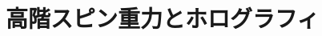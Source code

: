 \documentclass[../../master.tex]{subfiles}
\begin{document}
\chapter{高階スピン重力とホログラフィ}
\end{document}
